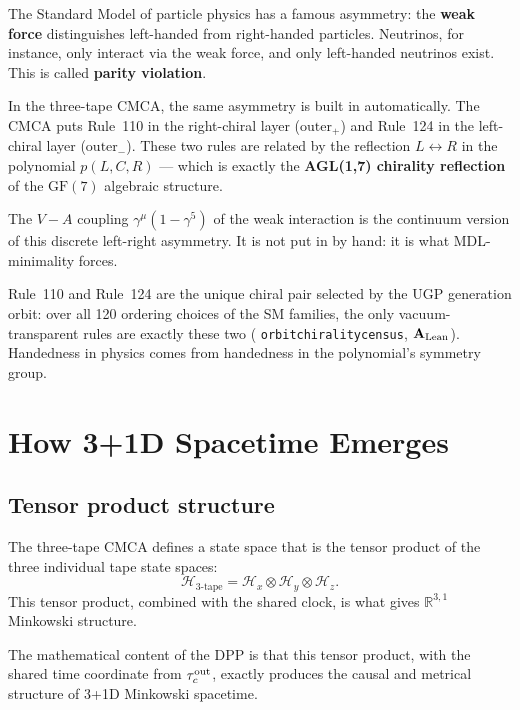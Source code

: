 \documentclass[11pt,a4paper]{article}
\newcommand{\term}[1]{\textbf{#1}}
\newcommand{\lean}[1]{%
  \penalty-100
  \begingroup\def\_{\textunderscore\allowbreak}\texttt{#1}\endgroup}
\newcommand{\CatAL}{\ensuremath{\mathbf{A}_{\rm Lean}}}
\begin{document}
The Standard Model of particle physics has a famous asymmetry: the
\term{weak force} distinguishes left-handed from right-handed particles.
Neutrinos, for instance, only interact via the weak force, and only
left-handed neutrinos exist.  This is called \term{parity violation}.

In the three-tape CMCA, the same asymmetry is built in automatically.
The CMCA puts Rule~110 in the right-chiral layer ($\mathrm{outer}_+$) and
Rule~124 in the left-chiral layer ($\mathrm{outer}_-$).  These two rules
are related by the reflection $L \leftrightarrow R$ in the polynomial
$p(L,C,R)$ --- which is exactly the \term{AGL(1,7) chirality reflection}
of the $\mathrm{GF}(7)$ algebraic structure.

The $V{-}A$ coupling $\gamma^\mu(1 - \gamma^5)$ of the weak interaction
is the continuum version of this discrete left-right asymmetry.
It is not put in by hand: it is what MDL-minimality forces.

\begin{tcolorbox}[colback=boxblue,colframe=blue!40!black,
  title=Chirality and parity violation in one sentence]
Rule~110 and Rule~124 are the unique chiral pair selected by the UGP
generation orbit: over all 120 ordering choices of the SM families,
the only vacuum-transparent rules are exactly these two
(\lean{orbit\_chirality\_census}, \CatAL).
Handedness in physics comes from handedness in the polynomial's symmetry group.
\end{tcolorbox}

\section{How 3+1D Spacetime Emerges}
\label{sec:emergence}

\subsection{Tensor product structure}

The three-tape CMCA defines a state space that is the tensor product of the
three individual tape state spaces:
\[
  \mathcal{H}_{3\text{-tape}} = \mathcal{H}_x \otimes \mathcal{H}_y \otimes \mathcal{H}_z.
\]
This tensor product, combined with the shared clock, is what gives
$\mathbb{R}^{3,1}$ Minkowski structure.

The mathematical content of the DPP is that this tensor product, with
the shared time coordinate from $\tau_c^{\rm out}$, exactly produces the
causal and metrical structure of 3+1D Minkowski spacetime.
\end{document}

